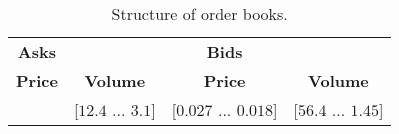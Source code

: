 \begin{table}[ht]
    \centering
    \begin{tabular}{c c| c c}
        \hline
         \textbf{Asks} & & \textbf{Bids} & \\
         \textbf{Price} & \textbf{Volume} & \textbf{Price} & \textbf{Volume}\\
         \hline
         [$0.028$ ... $0.14$] & [$12.4$ ... $3.1$] & [$0.027$ ... $0.018$] & [$56.4$ ... $1.45$]\\
         \hline
    \end{tabular}
    \caption[Structure - Order book]{Structure of order books.}
    \label{tab:order_book}
\end{table}